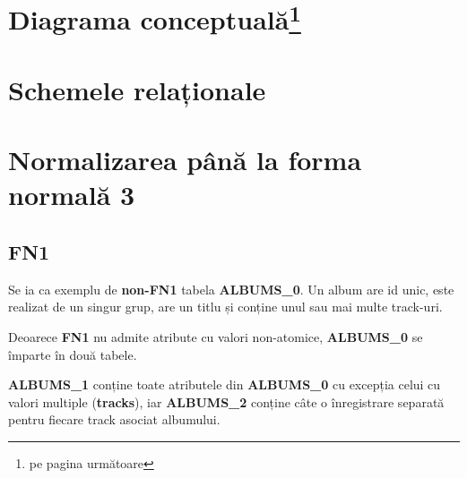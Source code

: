 \documentclass[a4paper, oneside, 12pt]{article}
\newcommand{\rowstyle}[1]{\gdef\currentrowstyle{#1}%
  #1\ignorespaces
}
\begin{document}


\section{Diagrama conceptuală\footnote{pe pagina următoare}}



\section{Schemele relaționale}

\begin{center}



\end{center}

\section{Normalizarea până la forma normală 3}

\subsection{FN1}

Se ia ca exemplu de \textbf{non-FN1} tabela \textbf{ALBUMS\_0}. Un album are id
unic, este realizat de un singur grup, are un titlu și conține unul sau mai multe track-uri.


\begin{table}[h]
\centering
\caption*{Tabela \textbf{ALBUMS\_0}:}
\end{table}

Deoarece \textbf{FN1} nu admite atribute cu valori non-atomice,
\textbf{ALBUMS\_0} se împarte în două tabele.

\textbf{ALBUMS\_1} conține
toate atributele din \textbf{ALBUMS\_0} cu excepția celui cu valori multiple (\textbf{tracks}),
iar \textbf{ALBUMS\_2} conține câte o înregistrare separată pentru fiecare
track asociat albumului.
\end{document}
